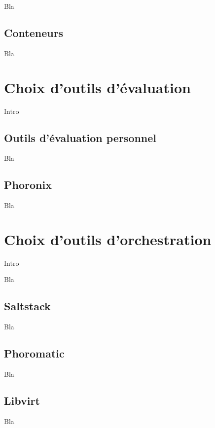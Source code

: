 Bla\\


\newpage
\subsection{Conteneurs}

Bla\\


\newpage

\section{Choix d'outils d’évaluation}

Intro

\subsection{Outils d'évaluation personnel}

Bla\\

\subsection{Phoronix}

Bla\\

\section{Choix d'outils d'orchestration}

Intro

Bla\\
\subsection{Saltstack}

Bla\\

\subsection{Phoromatic}

Bla\\

\subsection{Libvirt}

Bla\\